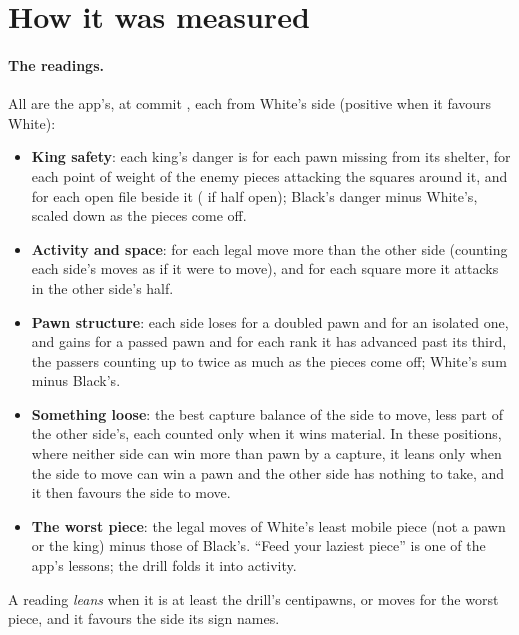 \documentclass[11pt]{article}
\begin{document}
\section{How it was measured}

\paragraph{The readings.} All are the app's, at commit \texttt{\AppCommit}, each from White's side
(positive when it favours White):

\begin{itemize}[nosep]
\item \textbf{King safety}: each king's danger is \WShield{} for each pawn missing from its
  shelter, \WRingAttacker{} for each point of weight of the enemy pieces attacking the squares
  around it, and \WOpenFile{} for each open file beside it (\WHalfOpenFile{} if half open); Black's
  danger minus White's, scaled down as the pieces come off.
\item \textbf{Activity and space}: \WMobility{} for each legal move more than the other side
  (counting each side's moves as if it were to move), and \WSpace{} for each square more it
  attacks in the other side's half.
\item \textbf{Pawn structure}: each side loses \WDoubled{} for a doubled pawn and \WIsolated{} for
  an isolated one, and gains \WPassed{} for a passed pawn and \WPassedRank{} for each rank it has
  advanced past its third, the passers counting up to twice as much as the pieces come off;
  White's sum minus Black's.
\item \textbf{Something loose}: the best capture balance of the side to move, less part of the
  other side's, each counted only when it wins material. In these positions, where neither side
  can win more than \TacticBar{} pawn by a capture, it leans only when the side to move can win a
  pawn and the other side has nothing to take, and it then favours the side to move.
\item \textbf{The worst piece}: the legal moves of White's least mobile piece (not a pawn or the
  king) minus those of Black's. ``Feed your laziest piece'' is one of the app's lessons; the drill
  folds it into activity.
\end{itemize}

A reading \emph{leans} when it is at least the drill's \LeanCp{} centipawns, or \WorstLean{}
moves for the worst piece, and it favours the side its sign names.
\end{document}
